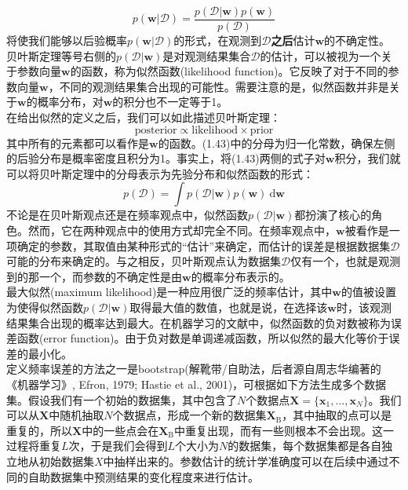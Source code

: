\documentclass[b5paper]{book}
\numberwithin{equation}{chapter}
\begin{document}
{	\begin{equation}
		p(\mathbf{w}|\mathcal{D})=\frac{p(\mathcal{D}|\mathbf{w})p(\mathbf{w})}{p(\mathcal{D})}
	\end{equation}
	将使我们能够以后验概率$p(\mathbf{w}|\mathcal{D})$的形式，在观测到$\mathcal{D}$\textbf{之后}估计$\mathbf{w}$的不确定性。\\
	\indent 贝叶斯定理等号右侧的$p(\mathcal{D}|\mathbf{w})$是对观测结果集合$\mathcal{D}$的估计，可以被视为一个关于参数向量$\mathbf{w}$的函数，称为似然函数(likelihood function)。它反映了对于不同的参数向量$\mathbf{w}$，不同的观测结果集合出现的可能性。需要注意的是，似然函数并非是关于$\mathbf{w}$的概率分布，对$\mathbf{w}$的积分也不一定等于1。\\
	\indent 在给出似然的定义之后，我们可以如此描述贝叶斯定理：
	\begin{equation}
		\mathrm{posterior \propto　likelihood　\times prior}
	\end{equation}
	\indent 其中所有的元素都可以看作是$\mathbf{w}$的函数。(1.43)中的分母为归一化常数，确保左侧的后验分布是概率密度且积分为1。事实上，将(1.43)两侧的式子对$\mathbf{w}$积分，我们就可以将贝叶斯定理中的分母表示为先验分布和似然函数的形式：
	\begin{equation}
		p(\mathcal{D})=\int p(\mathcal{D}|\mathbf{w})p(\mathbf{w})\ \mathrm{d}\mathbf{w}
	\end{equation}
	\indent 不论是在贝叶斯观点还是在频率观点中，似然函数$p(\mathcal{D}|\mathbf{w})$都扮演了核心的角色。然而，它在两种观点中的使用方式却完全不同。在频率观点中，$\mathbf{w}$被看作是一项确定的参数，其取值由某种形式的“估计”来确定，而估计的误差是根据数据集$\mathcal{D}$可能的分布来确定的。与之相反，贝叶斯观点认为数据集$\mathcal{D}$仅有一个，也就是观测到的那一个，而参数的不确定性是由$\mathbf{w}$的概率分布表示的。\\
	\indent 最大似然(maximum likelihood)是一种应用很广泛的频率估计，其中$\mathbf{w}$的值被设置为使得似然函数$p(\mathcal{D}|\mathbf{w})$取得最大值的数值，也就是说，在选择该$\mathbf{w}$时，该观测结果集合出现的概率达到最大。在机器学习的文献中，似然函数的负对数被称为误差函数(error function)。由于负对数是单调递减函数，所以似然的最大化等价于误差的最小化。\\
	\indent 定义频率误差的方法之一是bootstrap(解靴带/自助法，后者源自周志华编著的《机器学习》, Efron, 1979; Hastie et al., 2001)，可根据如下方法生成多个数据集。假设我们有一个初始的数据集，其中包含了$N$个数据点$\mathbf{X}=\{\mathbf{x}_1,...,\mathbf{x}_N\}$。我们可以从$\textbf{X}$中随机抽取$N$个数据点，形成一个新的数据集$\textbf{X}_\textrm{B}$，其中抽取的点可以是重复的，所以$\textbf{X}$中的一些点会在$\textbf{X}_\textrm{B}$中重复出现，而有一些则根本不会出现。这一过程将重复$L$次，于是我们会得到$L$个大小为$N$的数据集，每个数据集都是各自独立地从初始数据集$X$中抽样出来的。参数估计的统计学准确度可以在后续中通过不同的自助数据集中预测结果的变化程度来进行估计。\\
}
\end{document}
